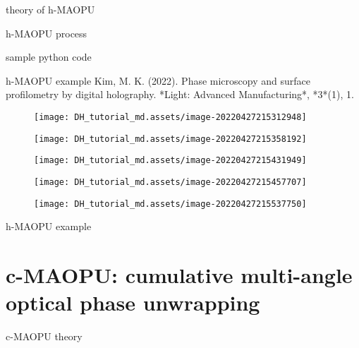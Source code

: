 \documentclass[t, aspectratio=169]{beamer}
\begin{document}
\begin{frame}{theory of h-MAOPU}

\end{frame}


\begin{frame}{h-MAOPU process}

\end{frame}


\begin{frame}{sample python code}

\end{frame}


\begin{frame}[allowframebreaks]{h-MAOPU example}
Kim, M. K. (2022). Phase microscopy and surface profilometry by digital holography. *Light: Advanced Manufacturing*, *3*(1), 1.
\begin{figure}
	\texttt{[image: DH\_tutorial\_md.assets/image-20220427215312948]}
\end{figure}
\begin{figure}
	\texttt{[image: DH\_tutorial\_md.assets/image-20220427215358192]}
\end{figure}
\begin{figure}
	\texttt{[image: DH\_tutorial\_md.assets/image-20220427215431949]}
\end{figure}
\begin{figure}
	\texttt{[image: DH\_tutorial\_md.assets/image-20220427215457707]}
\end{figure}
\begin{figure}
	\texttt{[image: DH\_tutorial\_md.assets/image-20220427215537750]}
\end{figure}
\end{frame}


\begin{frame}{h-MAOPU example}

\end{frame}


\section{c-MAOPU: cumulative multi-angle optical phase unwrapping}
\begin{frame}[c]
\centering\LARGE\textbf{\secname}
\end{frame}


\begin{frame}{c-MAOPU theory}

\end{frame}
\end{document}
